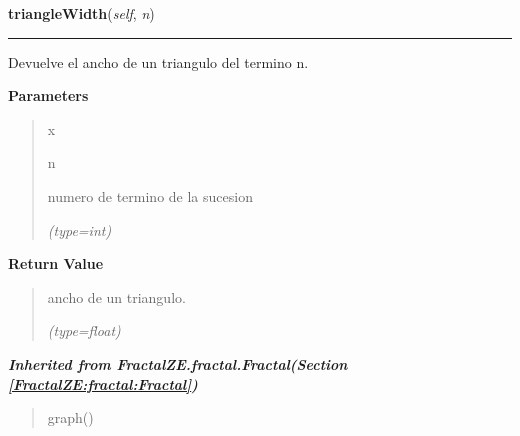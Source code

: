 \hspace{.8\funcindent}\begin{boxedminipage}{\funcwidth}

    \raggedright \textbf{triangleWidth}(\textit{self}, \textit{n})

    \vspace{-1.5ex}

    \rule{\textwidth}{0.5\fboxrule}
\setlength{\parskip}{2ex}
    Devuelve el ancho de un triangulo del termino n.

\setlength{\parskip}{1ex}
      \textbf{Parameters}
      \vspace{-1ex}

      \begin{quote}
        \begin{Ventry}{x}

          \item[n]

          numero de termino de la sucesion

            {\it (type=int)}

        \end{Ventry}

      \end{quote}

      \textbf{Return Value}
    \vspace{-1ex}

      \begin{quote}
      ancho de un triangulo.

      {\it (type=float)}

      \end{quote}

    \end{boxedminipage}


\large{\textbf{\textit{Inherited from FractalZE.fractal.Fractal\textit{(Section \ref{FractalZE:fractal:Fractal})}}}}

\begin{quote}
graph()
\end{quote}
